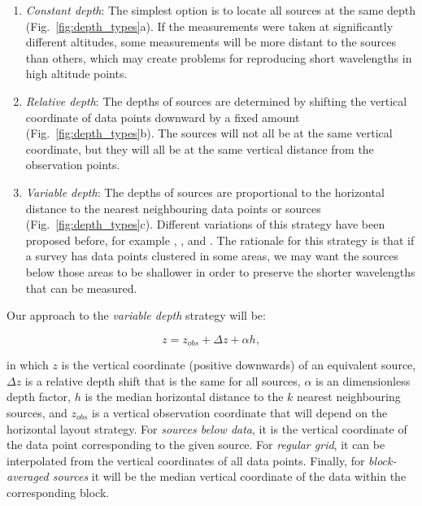 \begin{enumerate}
  \item
    \emph{Constant depth}:
    The simplest option is to locate all sources at the same depth
    (Fig.~\ref{fig:depth_types}a).
    If the measurements were taken at significantly different altitudes, some
    measurements will be more distant to the sources than others,
    which may create problems for reproducing short wavelengths in high
    altitude points.
 \item
    \emph{Relative depth}:
    The depths of sources are determined by shifting the vertical coordinate of
    data points downward by a fixed amount (Fig.~\ref{fig:depth_types}b).
    The sources will not all be at the same vertical coordinate, but they will
    all be at the same vertical distance from the observation points.
 \item
    \emph{Variable depth}:
    The depths of sources are proportional to the horizontal distance to the
    nearest neighbouring data points or sources (Fig.~\ref{fig:depth_types}c).
    Different variations of this strategy have been proposed before, for
    example \citet{cordell1992}, \citet{guspi2004}, and \citet{guspi2009}.
    The rationale for this strategy is that if a survey has data points
    clustered in some areas, we may
    want the sources below those areas to be shallower in order to preserve the
    shorter wavelengths that can be measured.
\end{enumerate}

Our approach to the \emph{variable depth} strategy will be:

\begin{equation}
  z = z_{obs} + \Delta z + \alpha h,
  \label{eq:variable_depth}
\end{equation}

\noindent
in which $z$ is the vertical coordinate (positive downwards) of an equivalent
source,
$\Delta z$ is a relative depth shift that is the same for all sources,
$\alpha$ is an dimensionless depth factor,
$h$ is the median horizontal distance to the $k$ nearest neighbouring sources,
and
$z_{obs}$ is a vertical observation coordinate that will depend on the
horizontal layout strategy.
For \emph{sources below data}, it is the vertical coordinate of the data point
corresponding to the given source.
For \emph{regular grid}, it can be interpolated from the vertical coordinates
of all data points.
Finally, for \emph{block-averaged sources} it will be the median vertical
coordinate of the data within the corresponding block.

